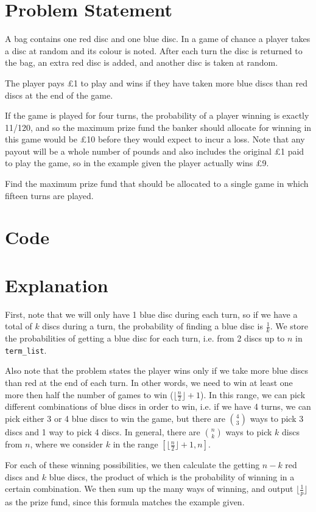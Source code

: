 \documentclass{article}
\begin{document}
    
\section{Problem Statement}

A bag contains one red disc and one blue disc. In a game of chance a player takes a disc at random and its colour is noted. After each turn the disc is returned to the bag, an extra red disc is added, and another disc is taken at random.

The player pays £1 to play and wins if they have taken more blue discs than red discs at the end of the game.

If the game is played for four turns, the probability of a player winning is exactly 11/120, and so the maximum prize fund the banker should allocate for winning in this game would be £10 before they would expect to incur a loss. Note that any payout will be a whole number of pounds and also includes the original £1 paid to play the game, so in the example given the player actually wins £9.

Find the maximum prize fund that should be allocated to a single game in which fifteen turns are played.

\section{Code}



\newpage
\section{Explanation}

First, note that we will only have 1 blue disc during each turn, so if we have a total of $k$ discs during a turn,
the probability of finding a blue disc is $\frac{1}{k}$. We store the probabilities of getting a blue disc for each turn,
i.e. from 2 discs up to $n$ in \verb|term_list|. 

Also note that the problem states the player wins only if we take more blue discs than red at the end of each turn. In other words, we need to win at least one more then half the number of games to win ($\lfloor
\frac{n}{2} \rfloor+1$). In this range, we can pick different combinations of blue discs in order to win, i.e. if we have 4 turns, we can pick either 3 or 4 blue discs to win the game, but there are ${4\choose 3}$ ways to pick 3 discs and 1 way to pick 4 discs.
In general, there are ${n\choose k}$ ways to pick $k$ discs from $n$, where we consider $k$ in the range $[\lfloor\frac{n}{2} \rfloor+1,n]$.

For each of these winning possibilities, we then calculate the getting $n-k$ red discs and $k$ blue discs, the product of which is the probability of winning in a certain combination.
We then sum up the many ways of winning, and output $\lfloor \frac{1}{p}\rfloor$ as the prize fund, since this formula matches the example given.
\end{document}
